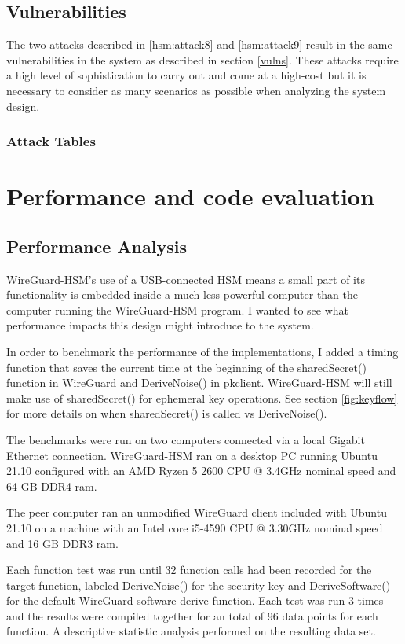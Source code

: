 \documentclass [11pt, proquest] {uwthesis}[2020/02/24]
\begin{document}
\section{Vulnerabilities}
\label{hsm-vulns}
The two attacks described in \ref{hsm:attack8} and \ref{hsm:attack9} result in the same vulnerabilities in the system as described in section \ref{vulns}. These attacks require a high level of sophistication to carry out and come at a high-cost but it is necessary to consider as many scenarios as possible when analyzing the system design.

\subsection{Attack Tables}


\chapter{Performance and code evaluation}
\section{Performance Analysis}

\label{performance}
WireGuard-HSM's use of a USB-connected HSM means a small part of its functionality is embedded inside a much less powerful computer than the computer running the WireGuard-HSM program. I wanted to see what performance impacts this design might introduce to the system. 

In order to benchmark the performance of the implementations, I added a timing function that saves the current time at the beginning of the sharedSecret() function in WireGuard and DeriveNoise() in pkclient. WireGuard-HSM will still make use of sharedSecret() for ephemeral key operations.
See section \ref{fig:keyflow} for more details on when sharedSecret() is called vs DeriveNoise().

The benchmarks were run on two computers connected via a local Gigabit Ethernet connection. 
WireGuard-HSM ran on a desktop PC running Ubuntu 21.10 configured with an AMD Ryzen 5 2600 CPU @ 3.4GHz nominal speed and 64 GB DDR4 ram. 

The peer computer ran an unmodified WireGuard client included with Ubuntu 21.10 on a machine with an Intel core i5-4590 CPU @ 3.30GHz nominal speed and 16 GB DDR3 ram.  

Each function test was run until 32 function calls had been recorded for the target function, labeled DeriveNoise() for the security key and DeriveSoftware() for the default WireGuard software derive function.
Each test was run 3 times and the results were compiled together for an total of 96 data points for each function. A descriptive statistic analysis performed on the resulting data set.
\end{document}
